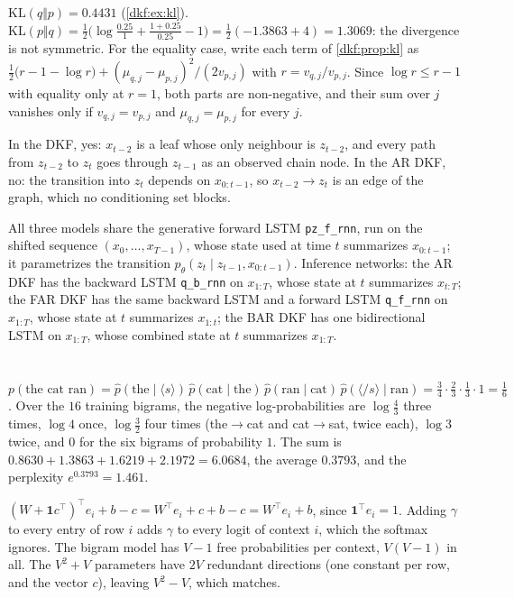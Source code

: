 $\mathrm{KL}(q\Vert p) = 0.4431$ (\cref{dkf:ex:kl}). $\mathrm{KL}(p\Vert q) = \frac12\bigl(\log\frac{0.25}1 + \frac{1 + 0.25}{0.25} - 1\bigr) = \frac12(-1.3863 + 4) = 1.3069$: the
divergence is not symmetric. For the equality case, write each term of
\cref{dkf:prop:kl} as $\frac12\bigl(r - 1 - \log r\bigr) + (\mu_{q,j} - \mu_{p,j})^2/(2v_{p,j})$ with $r = v_{q,j}/v_{p,j}$. Since $\log r\leq r - 1$ with equality only at
$r = 1$, both parts are non-negative, and their sum over $j$ vanishes only if $v_{q,j} = v_{p,j}$ and $\mu_{q,j} = \mu_{p,j}$ for every $j$.

In the DKF, yes: $x_{t-2}$ is a leaf whose only neighbour is $z_{t-2}$, and every path from $z_{t-2}$ to $z_t$ goes through
$z_{t-1}$ as an observed chain node. In the AR DKF, no: the transition into $z_t$ depends on $x_{0:t-1}$, so
$x_{t-2}\to z_t$ is an edge of the graph, which no conditioning set blocks.

All three models share the generative forward LSTM \texttt{pz\_f\_rnn}, run on the shifted sequence
$(x_0,\dots,x_{T-1})$, whose state used at time $t$ summarizes $x_{0:t-1}$; it parametrizes the transition
$p_\theta(z_t\mid z_{t-1}, x_{0:t-1})$. Inference
networks: the AR DKF has the backward LSTM \texttt{q\_b\_rnn} on $x_{1:T}$, whose state at $t$ summarizes $x_{t:T}$; the
FAR DKF has the same backward LSTM and a forward LSTM \texttt{q\_f\_rnn} on $x_{1:T}$, whose state at $t$ summarizes
$x_{1:t}$; the BAR DKF has one bidirectional LSTM on $x_{1:T}$, whose combined state at $t$ summarizes $x_{1:T}$.

\section{}

$p(\text{the cat ran}) = \hat p(\text{the}\mid\langle s\rangle)\,\hat p(\text{cat}\mid\text{the})\,\hat p(\text{ran}\mid\text{cat})\,\hat p(\langle/s\rangle\mid\text{ran}) = \frac34\cdot\frac23\cdot\frac13\cdot1 = \frac16$. Over the $16$ training bigrams, the
negative log-probabilities are $\log\frac43$ three times, $\log4$ once, $\log\frac32$ four times (the$\to$cat and cat$\to$sat, twice
each), $\log3$ twice, and $0$ for the six bigrams of probability $1$. The sum is $0.8630 + 1.3863 + 1.6219 + 2.1972 = 6.0684$, the
average $0.3793$, and the perplexity $e^{0.3793} = 1.461$.

$(W + \mathbf 1c^\top)^\top e_i + b - c = W^\top e_i + c + b - c = W^\top e_i + b$, since $\mathbf 1^\top e_i = 1$. Adding $\gamma$ to every entry of row $i$ adds $\gamma$ to every logit of context
$i$, which the softmax ignores. The bigram model has $V - 1$ free probabilities per context, $V(V - 1)$ in all.
The $V^2 + V$ parameters have $2V$ redundant directions (one constant per row, and the vector $c$), leaving
$V^2 - V$, which matches.


